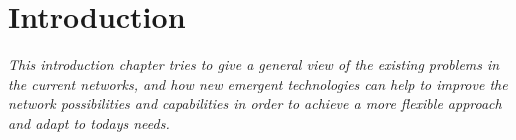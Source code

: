 \chapter{Introduction}
\label{ch:introduction}

\textit{This introduction chapter tries to give a general view of the existing problems in the current networks, and how new emergent technologies can help to improve the network possibilities and capabilities in order to achieve a more flexible approach and adapt to todays needs.}






